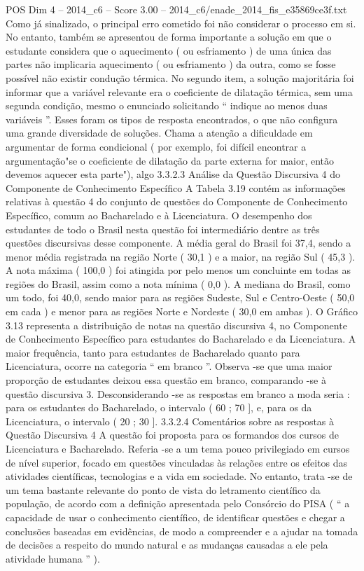 \begin{textsample}{POS Dim 4 – 2014\_c6 – Score 3.00 – 2014\_c6/enade\_2014\_fis\_e35869ce3f.txt}
Como já sinalizado, o principal erro cometido foi não considerar o processo em si.
No entanto, também se apresentou de forma importante a solução em que o estudante considera que o aquecimento ( ou esfriamento ) de uma única das partes não implicaria aquecimento ( ou esfriamento ) da outra, como se fosse possível não existir condução térmica.
No segundo item, a solução majoritária foi informar que a variável relevante era o coeficiente de dilatação térmica, sem uma segunda condição, mesmo o enunciado solicitando “ indique ao menos duas variáveis ”.
Esses foram os tipos de resposta encontrados, o que não configura uma grande diversidade de soluções.
Chama a atenção a dificuldade em argumentar de forma condicional ( por exemplo, foi difícil encontrar a argumentação"se o coeficiente de dilatação da parte externa for maior, então devemos aquecer esta parte"), algo 3.3.2.3 Análise da Questão Discursiva 4 do Componente de Conhecimento Específico A Tabela 3.19 contém as informações relativas à questão 4 do conjunto de questões do Componente de Conhecimento Específico, comum ao Bacharelado e à Licenciatura.
O desempenho dos estudantes de todo o Brasil nesta questão foi intermediário dentre as três questões discursivas desse componente.
A média geral do Brasil foi 37,4, sendo a menor média registrada na região Norte ( 30,1 ) e a maior, na região Sul ( 45,3 ).
A nota máxima ( 100,0 ) foi atingida por pelo menos um concluinte em todas as regiões do Brasil, assim como a nota mínima ( 0,0 ).
A mediana do Brasil, como um todo, foi 40,0, sendo maior para as regiões Sudeste, Sul e Centro-Oeste ( 50,0 em cada ) e menor para as regiões Norte e Nordeste ( 30,0 em ambas ).
O Gráfico 3.13 representa a distribuição de notas na questão discursiva 4, no Componente de Conhecimento Específico para estudantes do Bacharelado e da Licenciatura.
A maior frequência, tanto para estudantes de Bacharelado quanto para Licenciatura, ocorre na categoria “ em branco ”.
Observa -se que uma maior proporção de estudantes deixou essa questão em branco, comparando -se à questão discursiva 3.
Desconsiderando -se as respostas em branco a moda seria : para os estudantes do Bacharelado, o intervalo ( 60 ; 70 ], e, para os da Licenciatura, o intervalo ( 20 ; 30 ]. 3.3.2.4 Comentários sobre as respostas à Questão Discursiva 4 A questão foi proposta para os formandos dos cursos de Licenciatura e Bacharelado.
Referia -se a um tema pouco privilegiado em cursos de nível superior, focado em questões vinculadas às relações entre os efeitos das atividades científicas, tecnologias e a vida em sociedade.
No entanto, trata -se de um tema bastante relevante do ponto de vista do letramento científico da população, de acordo com a definição apresentada pelo Consórcio do PISA ( “ a capacidade de usar o conhecimento científico, de identificar questões e chegar a conclusões baseadas em evidências, de modo a compreender e a ajudar na tomada de decisões a respeito do mundo natural e as mudanças causadas a ele pela atividade humana ” ).

\end{textsample}
